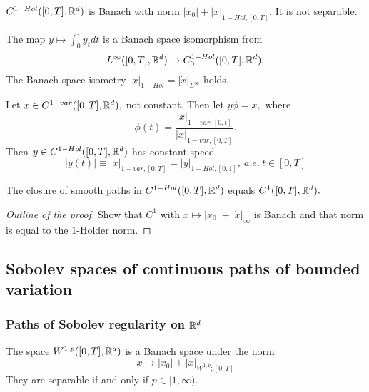 \begin{proposition}
    $C^{1-Hol}([0,T], \mathbb{R}^d)$ is Banach with norm $|x_0| + |x|_{1-Hol,[0,T]}.$ It is not separable.
\end{proposition}

\begin{proposition}
    The map $y \mapsto \int_0^{\cdot} y_t dt$ is a Banach space isomorphism from 
    \begin{equation}
        L^{\infty}([0,T], \mathbb{R}^d) \rightarrow C_0^{1-Hol}([0,T], \mathbb{R}^d).
    \end{equation}
    The Banach space isometry $|x|_{1-Hol} = |\dot{x}|_{L^{\infty}}$ holds.
\end{proposition}

\begin{proposition}[reparametrization]
    Let $x \in C^{1-var}([0,T], \mathbb{R}^d),$ not constant. Then let $y\phi = x,$ where 
    \begin{equation}
        \phi(t) = \frac{|x|_{1-var, [0,t]}}{|x|_{1-var, [0,T]}}.
    \end{equation}
    Then $y \in C^{1-Hol}([0,T], \mathbb{R}^d)$ has constant speed.
    \begin{equation}
        |\dot{y}(t)| \equiv |x|_{1-var, [0,T]} = |y|_{1-Hol,[0,1]}, \ a.e.\ t \in [0,T]
    \end{equation}
\end{proposition}

\begin{proposition}
    The closure of smooth paths in $C^{1-Hol}([0,T],\mathbb{R}^d)$ equals $C^1([0,T], \mathbb{R}^d).$
\end{proposition}
\begin{proof}[Outline of the proof]
    Show that $C^1$ with $x \mapsto |x_0| + |\dot{x}|_{\infty}$ is Banach and that norm is equal to the 1-Holder norm. 
\end{proof}

\subsection{Sobolev spaces of continuous paths of bounded
variation}

\subsubsection{Paths of Sobolev regularity on $\mathbb{R}^d$}

\begin{proposition}
    The space $W^{1,p}([0,T],\mathbb{R}^d)$ is a Banach space under the norm
    \begin{equation}
        x \mapsto |x_0| + |x|_{W^{1,p};[0,T]}
    \end{equation}
    They are separable if and only if $p \in [1, \infty).$
\end{proposition}

